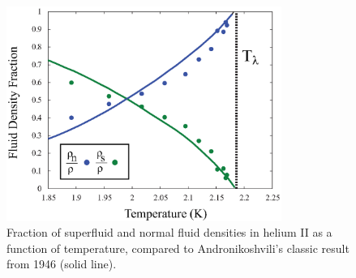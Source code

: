 \begin{figure}[htbp]
\begin{center}
\includegraphics[height=70mm]{./figures/density.eps}
\caption{\small{Fraction of superfluid and normal fluid densities in
    helium II as a function of temperature, compared to
    Andronikoshvili's classic result from 1946 (solid
    line)\cite{andro}.}}
\label{fig:density}
\end{center}
\end{figure}

